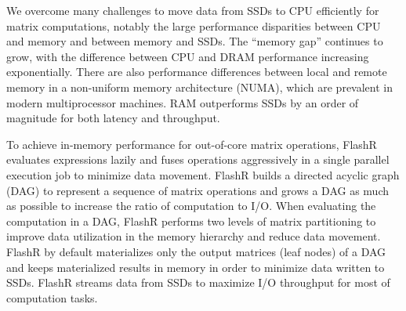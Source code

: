 


We overcome many challenges to move data from SSDs to CPU efficiently for
matrix computations,
notably the large performance disparities between CPU and memory and between
memory and SSDs. The ``memory gap'' \cite{Wilkes01} continues to grow, with 
the difference between CPU and DRAM performance increasing exponentially. 
There are also performance differences between
local and remote memory in a non-uniform memory architecture (NUMA), which are prevalent
in modern multiprocessor machines. 
RAM outperforms SSDs by an order of magnitude for both latency and throughput.

To achieve in-memory performance for out-of-core matrix operations,
FlashR evaluates expressions lazily and fuses operations aggressively
in a single parallel execution job to minimize data movement. FlashR
builds a directed acyclic graph (DAG) to represent a sequence of matrix
operations and grows a DAG as much as possible to increase the ratio of
computation to I/O. When evaluating the computation in a DAG, FlashR
performs two levels of matrix partitioning to improve data utilization in
the memory hierarchy and reduce data movement.
FlashR by default materializes
only the output matrices (leaf nodes) of a DAG and keeps materialized results in
memory in order to minimize data written to SSDs. FlashR streams
data from SSDs to maximize I/O throughput for most of computation tasks.

